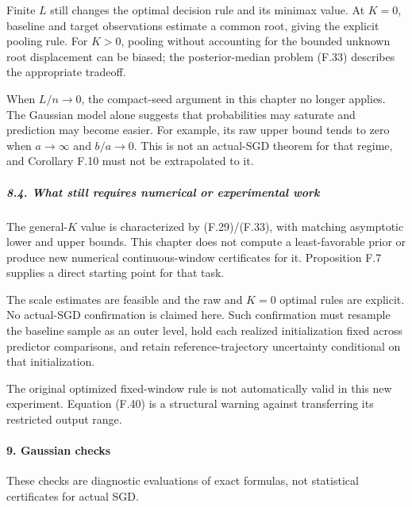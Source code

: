 Finite \(L\) still changes the optimal decision rule and its minimax
value. At \(K=0\), baseline and target observations estimate a common
root, giving the explicit pooling rule. For \(K>0\), pooling without
accounting for the bounded unknown root displacement can be biased; the
posterior-median problem (F.33) describes the appropriate tradeoff.

When \(L/n\to0\), the compact-seed argument in this chapter no longer
applies. The Gaussian model alone suggests that probabilities may
saturate and prediction may become easier. For example, its raw upper
bound tends to zero when \(a\to\infty\) and \(b/a\to0\). This is not an
actual-SGD theorem for that regime, and Corollary F.10 must not be
extrapolated to it.

\subparagraph{8.4. What still requires numerical or experimental
work}\label{what-still-requires-numerical-or-experimental-work}

The general-\(K\) value is characterized by (F.29)/(F.33), with matching
asymptotic lower and upper bounds. This chapter does not compute a
least-favorable prior or produce new numerical continuous-window
certificates for it. Proposition F.7 supplies a direct starting point
for that task.

The scale estimates are feasible and the raw and \(K=0\) optimal rules
are explicit. No actual-SGD confirmation is claimed here. Such
confirmation must resample the baseline sample as an outer level, hold
each realized initialization fixed across predictor comparisons, and
retain reference-trajectory uncertainty conditional on that
initialization.

The original optimized fixed-window rule is not automatically valid in
this new experiment. Equation (F.40) is a structural warning against
transferring its restricted output range.

\paragraph{9. Gaussian checks}\label{gaussian-checks}

These checks are diagnostic evaluations of exact formulas, not
statistical certificates for actual SGD.


